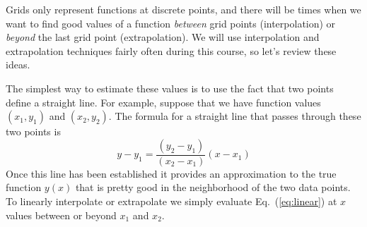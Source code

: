 
 

Grids only represent functions at discrete points, and there will be
times when we want to find good values of a function {\it between}
grid points (interpolation) or \emph{beyond} the last grid point
(extrapolation). We will use interpolation and extrapolation
techniques fairly often during this course, so let's review these
ideas.


The simplest way to estimate these values is to use the fact that two
points define a straight line. For example, suppose that we have
function values $(x_1,y_1)$ and $(x_2,y_2)$. The formula for a
straight line that passes through these two points is
\begin{equation} \label{eq:linear}
    y-y_1 = \frac{ (y_2-y_1) }{ (x_2-x_1) } (x-x_1)
\end{equation}
Once this line has been established it provides an approximation to
the true function $y(x)$ that is pretty good in the neighborhood of
the two data points. To linearly interpolate or extrapolate we simply
evaluate Eq.~(\ref{eq:linear}) at $x$ values between or beyond $x_1$
and $x_2$.

